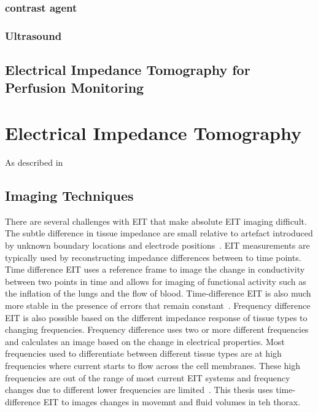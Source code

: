 \subsubsection{contrast agent}
\subsubsection{Ultrasound}
\subsection{Electrical Impedance Tomography for Perfusion Monitoring}

\section{Electrical Impedance Tomography}
As described in  

\subsection{Imaging Techniques}
There are several challenges with EIT that make absolute EIT imaging difficult. 
The subtle difference in tissue impedance are small relative to artefact introduced 
by unknown boundary locations and electrode 
positions~\parencite{adler_why_2015,adler_electrical_2017,nissinen_compensation_2009}. 
EIT measurements are typically used by 
reconstructing impedance differences between to time points.
Time difference EIT uses a reference frame to image the change in conductivity between 
two points in time and allows for imaging of functional activity such as the inflation of the lungs 
and the flow of blood.
Time-difference EIT is also much more stable in the presence of errors that remain 
constant~\parencite{brown_electrical_2003,adler_electrical_2017}.
Frequency difference EIT is also possible based on the different impedance response 
of tissue types to changing frequencies. Frequency difference uses 
two or more different frequencies and calculates an image based on the change in electrical properties.
Most frequencies used to differentiate between different tissue types are at high frequencies 
where current starts to flow across the cell membranes. 
These high frequencies are out of the range of most current EIT systems and 
frequency changes due to different lower frequencies are limited~\parencite{adler_electrical_2017}.
This thesis uses time-difference EIT to images changes in movemnt and fluid volumes in teh thorax.

